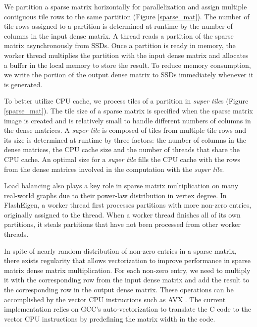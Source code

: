 We partition a sparse matrix horizontally for parallelization and assign multiple
contiguous tile rows to the same partition (Figure \ref{sparse_mat}).
The number of tile rows assigned to a partition is determined at runtime by
the number of columns in the input dense matrix.
A thread reads a partition of the sparse matrix
asynchronously from SSDs. Once a partition is ready in memory, the worker
thread multiplies the partition with the input dense matrix and allocates
a buffer in the local memory to store the result. To reduce memory consumption,
we write the portion of the output dense matrix to SSDs immediately whenever
it is generated. 

To better utilize CPU cache, we process tiles of a partition in
\textit{super tile}s (Figure \ref{sparse_mat}). The tile size of a sparse
matrix is specified when the sparse matrix image is created and is relatively
small to handle different numbers of columns in the dense matrices.
A \textit{super tile} is composed of tiles from multiple tile rows and its
size is determined at runtime by three factors: the number of columns
in the dense matrices, the CPU cache size and the number of threads that
share the CPU cache. An optimal size for a \textit{super tile} fills
the CPU cache with the rows from the dense matrices involved in
the computation with the \textit{super tile}.

Load balancing also plays a key role in sparse matrix multiplication on
many real-world graphs due to their power-law distribution in vertex degree.
In FlashEigen, a worker thread first processes partitions with more non-zero
entries, originally assigned to the thread. When a worker thread finishes
all of its own partitions, it steals partitions that have not been processed
from other worker threads.

In spite of nearly random distribution of non-zero entries in a sparse matrix,
there exists regularity that allows vectorization to improve performance
in sparse matrix dense matrix multiplication. For each non-zero entry, we
need to multiply it with the corresponding row from the input dense matrix
and add the result to the corresponding row in the output dense matrix.
These operations can be accomplished by the vector CPU instructions such as
AVX \cite{avx}. The current implementation relies on GCC's auto-vectorization
to translate the C code to the vector CPU instructions by predefining the matrix
width in the code.

